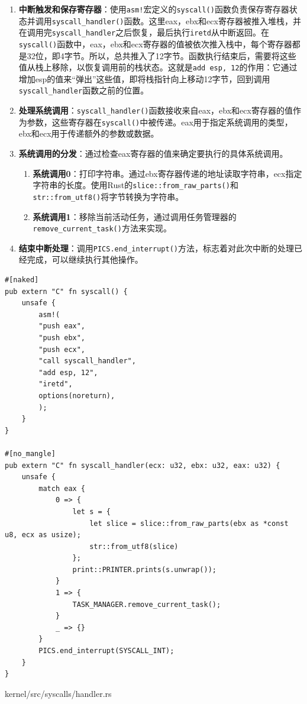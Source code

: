 \begin{enumerate}
    \item \textbf{中断触发和保存寄存器}：使用\texttt{asm!}宏定义的\texttt{syscall()}函数负责保存寄存器状态并调用\texttt{syscall\_handler()}函数。这里eax，ebx和ecx寄存器被推入堆栈，并在调用完\texttt{syscall\_handler}之后恢复，最后执行\texttt{iretd}从中断返回。在\texttt{syscall()}函数中，eax，ebx和ecx寄存器的值被依次推入栈中，每个寄存器都是32位，即4字节。所以，总共推入了12字节。函数执行结束后，需要将这些值从栈上移除，以恢复调用前的栈状态。这就是\texttt{add esp, 12}的作用：它通过增加esp的值来“弹出”这些值，即将栈指针向上移动12字节，回到调用\texttt{syscall\_handler}函数之前的位置。
    \item \textbf{处理系统调用}：\texttt{syscall\_handler()}函数接收来自eax，ebx和ecx寄存器的值作为参数，这些寄存器在\texttt{syscall()}中被传递。eax用于指定系统调用的类型，ebx和ecx用于传递额外的参数或数据。
    \item \textbf{系统调用的分发}：通过检查eax寄存器的值来确定要执行的具体系统调用。
          \begin{enumerate}
              \item \textbf{系统调用0}：打印字符串。通过ebx寄存器传递的地址读取字符串，ecx指定字符串的长度。使用Rust的\texttt{slice::from\_raw\_parts()}和\texttt{str::from\_utf8()}将字节转换为字符串。
              \item \textbf{系统调用1}：移除当前活动任务，通过调用任务管理器的\texttt{remove\_current\_task()}方法来实现。
          \end{enumerate}
    \item \textbf{结束中断处理}：调用\texttt{PICS.end\_interrupt()}方法，标志着对此次中断的处理已经完成，可以继续执行其他操作。
\end{enumerate}

\begin{listing}[htbp]
    \begin{verbatim}
#[naked]
pub extern "C" fn syscall() {
    unsafe {
        asm!(
        "push eax",
        "push ebx",
        "push ecx",
        "call syscall_handler",
        "add esp, 12",
        "iretd",
        options(noreturn),
        );
    }
}

#[no_mangle]
pub extern "C" fn syscall_handler(ecx: u32, ebx: u32, eax: u32) {
    unsafe {
        match eax {
            0 => {
                let s = {
                    let slice = slice::from_raw_parts(ebx as *const u8, ecx as usize);
                    str::from_utf8(slice)
                };
                print::PRINTER.prints(s.unwrap());
            }
            1 => {
                TASK_MANAGER.remove_current_task();
            }
            _ => {}
        }
        PICS.end_interrupt(SYSCALL_INT);
    }
}
    \end{verbatim}
    \caption{kernel/src/syscalls/handler.rs}\label{lst:HandlerRust}
\end{listing}

